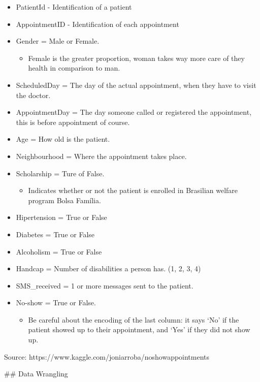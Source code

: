 \documentclass[11pt]{article}
\providecommand{\tightlist}{%
      \setlength{\itemsep}{0pt}\setlength{\parskip}{0pt}}
\begin{document}
\begin{itemize}
\tightlist
\item
  PatientId - Identification of a patient
\item
  AppointmentID - Identification of each appointment
\item
  Gender = Male or Female.

  \begin{itemize}
  \tightlist
  \item
    Female is the greater proportion, woman takes way more care of they
    health in comparison to man.
  \end{itemize}
\item
  ScheduledDay = The day of the actual appointment, when they have to
  visit the doctor.
\item
  AppointmentDay = The day someone called or registered the appointment,
  this is before appointment of course.
\item
  Age = How old is the patient.
\item
  Neighbourhood = Where the appointment takes place.
\item
  Scholarship = Ture of False.

  \begin{itemize}
  \tightlist
  \item
    Indicates whether or not the patient is enrolled in Brasilian
    welfare program Bolsa Família.
  \end{itemize}
\item
  Hipertension = True or False
\item
  Diabetes = True or False
\item
  Alcoholism = True or False
\item
  Handcap = Number of disabilities a person has. (1, 2, 3, 4)
\item
  SMS\_received = 1 or more messages sent to the patient.
\item
  No-show = True or False.

  \begin{itemize}
  \tightlist
  \item
    Be careful about the encoding of the last column: it says `No' if
    the patient showed up to their appointment, and `Yes' if they did
    not show up.
  \end{itemize}
\end{itemize}

Source: https://www.kaggle.com/joniarroba/noshowappointments

     \#\# Data Wrangling
\end{document}
